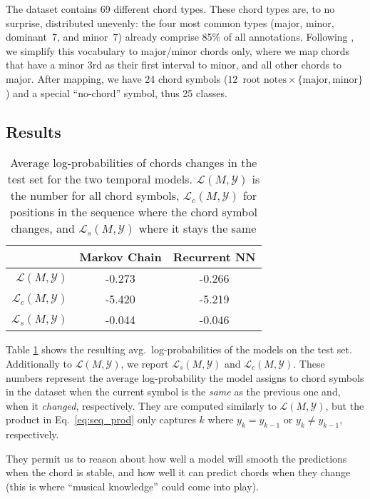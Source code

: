 \documentclass[twocolumn]{article}
\newcommand{\Y}{\mathcal{Y}}
\renewcommand{\L}{\mathcal{L}}
\begin{document}
The dataset contains 69 different chord types. These chord types are, to no
surprise, distributed unevenly: the four most common types (major, minor,
dominant~7, and minor~7) already comprise 85\% of all annotations. Following
\cite{cho_relative_2014}, we simplify this vocabulary to major/minor chords only,
where we map chords that have a minor 3rd as their first interval to minor, and
all other chords to major. After mapping, we have 24 chord symbols
($12\enspace\text{root notes} \times \{\text{major}, \text{minor}\}$) and a
special ``no-chord'' symbol, thus 25 classes.

\subsection{Results}

\begin{table}[]
\centering
\begin{tabular}{rcc}
\hline
                       & \textbf{Markov Chain} & \textbf{Recurrent NN} \\ \hline
$\L(M, \Y)$   & -0.273                 & -0.266                \\
$\L_c(M, \Y)$ & -5.420                  & -5.219                  \\
$\L_s(M, \Y)$ & -0.044                & -0.046                \\ \hline
\end{tabular}
\caption{Average log-probabilities of chords changes in the test set for the
        two temporal models. $\L(M, \Y)$ is the number for all
        chord symbols, $\L_c(M, \Y)$ for positions in the sequence
        where the chord symbol changes, and $\L_s(M, \Y)$ where
        it stays the same}
\label{tab:res_chordmod}
\end{table}

Table \ref{tab:res_chordmod} shows the resulting avg.\ log-probabilities of the
models on the test set. Additionally to $\L(M, \Y)$, we report
$\L_s(M, \Y)$ and $\L_c(M, \Y)$. These numbers represent the
average log-probability the model assigns to chord symbols in the dataset when
the current symbol is the \emph{same} as the previous one and, when it
\emph{changed}, respectively. They are computed similarly to $\L(M,
\Y)$, but the product in Eq.~\ref{eq:seq_prod} only captures $k$ where $y_k =
y_{k-1}$ or $y_k \neq y_{k-1}$, respectively.

They permit us to reason about how well a model will smooth the predictions
when the chord is stable, and how well it can predict chords when they change
(this is where ``musical knowledge'' could come into play).
\end{document}
